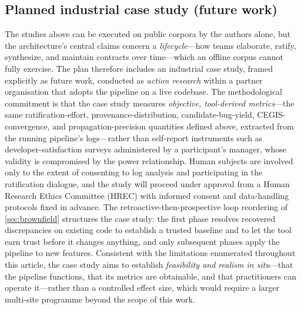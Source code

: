 \subsection{Planned industrial case study (future work)}\label{subsec:eval_industrial}

The studies above can be executed on public corpora by the authors alone, but the architecture's central claims concern a \emph{lifecycle}---how teams elaborate, ratify, synthesize, and maintain contracts over time---which an offline corpus cannot fully exercise. The plan therefore includes an industrial case study, framed explicitly as future work, conducted as \emph{action research} within a partner organisation that adopts the pipeline on a live codebase. The methodological commitment is that the case study measures \emph{objective, tool-derived metrics}---the same ratification-effort, provenance-distribution, candidate-bug-yield, CEGIS-convergence, and propagation-precision quantities defined above, extracted from the running pipeline's logs---rather than self-report instruments such as developer-satisfaction surveys administered by a participant's manager, whose validity is compromised by the power relationship. Human subjects are involved only to the extent of consenting to log analysis and participating in the ratification dialogue, and the study will proceed under approval from a Human Research Ethics Committee (HREC) with informed consent and data-handling protocols fixed in advance. The retroactive-then-prospective loop reordering of \cref{sec:brownfield} structures the case study: the first phase resolves recovered discrepancies on existing code to establish a trusted baseline and to let the tool earn trust before it changes anything, and only subsequent phases apply the pipeline to new features. Consistent with the limitations enumerated throughout this article, the case study aims to establish \emph{feasibility and realism in situ}---that the pipeline functions, that its metrics are obtainable, and that practitioners can operate it---rather than a controlled effect size, which would require a larger multi-site programme beyond the scope of this work.
